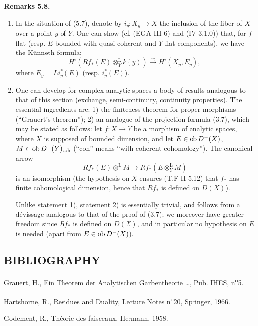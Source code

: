 \textbf{Remarks 5.8.}
\begin{enumerate}[label=\alph*)]
\item In the situation of (5.7), denote by \(i_y:X_y\to X\) the inclusion of the fiber of \(X\) over a point \(y\) of \(Y\). One can show (cf. (EGA III 6) and (IV 3.1.0)) that, for \(f\) flat (resp. \(E\) bounded with quasi-coherent and \(Y\)-flat components), we have the Künneth formula:
\[
 H^i(Rf_*(E)\otimes_Y^{\mathrm L}k(y))\xrightarrow{\sim}H^i(X_y,E_y),
\]
where \(E_y=Li_y^*(E)\) (resp. \(i_y^*(E)\)).
%
\item One can develop for complex analytic spaces a body of results analogous to that of this section (exchange, semi-continuity, continuity properties). The essential ingredients are: 1) the finiteness theorem for proper morphisms (``Grauert's theorem''); 2) an analogue of the projection formula (3.7), which may be stated as follows: let \(f:X\to Y\) be a morphism of analytic spaces, where \(X\) is supposed of bounded dimension, and let \(E\in\operatorname{ob} D^-(X)\), \(M\in\operatorname{ob} D^-(Y)_{\mathrm{coh}}\) (``coh'' means ``with coherent cohomology''). The canonical arrow
\[
 Rf_*(E)\otimes^{\mathrm L}M\longrightarrow Rf_*(E\otimes_Y^{\mathrm L}M)
\]
is an isomorphism (the hypothesis on \(X\) ensures (T.F II 5.12) that \(f_*\) has finite cohomological dimension, hence that \(Rf_*\) is defined on \(D(X)\)).

Unlike statement 1), statement 2) is essentially trivial, and follows from a dévissage analogous to that of the proof of (3.7); we moreover have greater freedom since \(Rf_*\) is defined on \(D(X)\), and in particular no hypothesis on \(E\) is needed (apart from \(E\in\operatorname{ob} D^-(X)\)).
\end{enumerate}

\subsection*{BIBLIOGRAPHY}
\begin{enumerate}[label={[\arabic*]}]
\item[{[1]}] Grauert, H., Ein Theorem der Analytischen Garbentheorie \ldots, Pub. IHES, n\textsuperscript{o}5.
\item[{[H]}] Hartshorne, R., Residues and Duality, Lecture Notes n\textsuperscript{o}20, Springer, 1966.
\item[{[T.F]}] Godement, R., Théorie des faisceaux, Hermann, 1958.
\end{enumerate}


